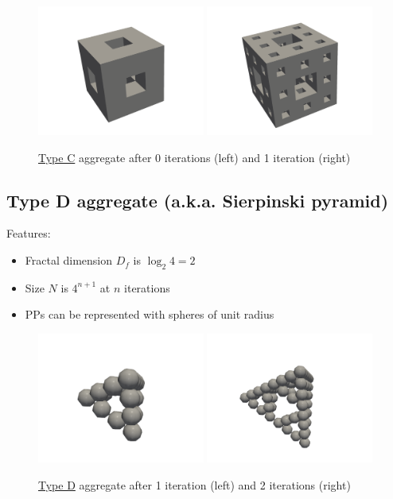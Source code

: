 \documentclass{article}
\begin{document}
\begin{figure}[htp]
\includegraphics[width=0.49\textwidth]{resources/type-c-img-1.png}
\includegraphics[width=0.49\textwidth]{resources/type-c-img-2.png}
\caption*{\underline{Type C} aggregate after 0 iterations (left) and 1 iteration (right)}
\end{figure}

\subsection*{Type D aggregate (a.k.a. Sierpinski pyramid)}

Features:

\begin{itemize}
	\item Fractal dimension $D_f$ is $\log_{2}{4}=2$
	\item Size $N$ is $4^{n+1}$ at $n$ iterations
	\item PPs can be represented with spheres of unit radius
\end{itemize}

\begin{figure}[htp]
\includegraphics[width=0.49\textwidth]{resources/type-d-img-2.png}
\includegraphics[width=0.49\textwidth]{resources/type-d-img-3.png}
\caption*{\underline{Type D} aggregate after 1 iteration (left) and 2 iterations (right)}
\end{figure}
\end{document}
